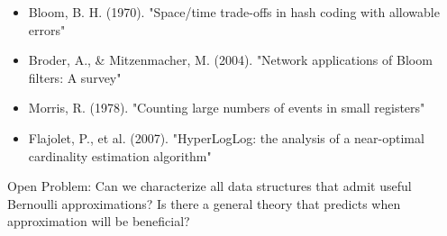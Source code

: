 \begin{itemize}
    \item Bloom, B. H. (1970). "Space/time trade-offs in hash coding with allowable errors"
    \item Broder, A., \& Mitzenmacher, M. (2004). "Network applications of Bloom filters: A survey"
    \item Morris, R. (1978). "Counting large numbers of events in small registers"
    \item Flajolet, P., et al. (2007). "HyperLogLog: the analysis of a near-optimal cardinality estimation algorithm"
\end{itemize}

\begin{researchfrontier}
Open Problem: Can we characterize all data structures that admit useful Bernoulli approximations? Is there a general theory that predicts when approximation will be beneficial?
\end{researchfrontier}